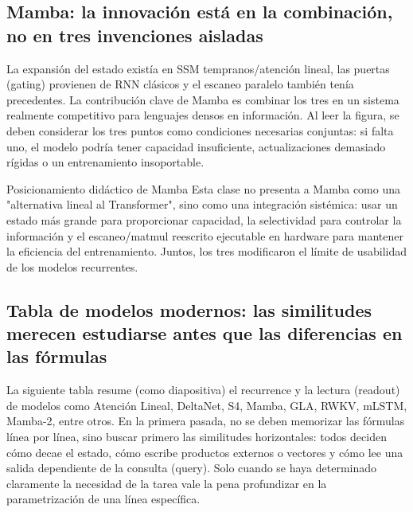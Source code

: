 
\subsection{Mamba: la innovación está en la combinación, no en tres invenciones aisladas}

La expansión del estado existía en SSM tempranos/atención lineal, las puertas (gating) provienen de RNN clásicos y el escaneo paralelo también tenía precedentes. La contribución clave de Mamba es combinar los tres en un sistema realmente competitivo para lenguajes densos en información. Al leer la figura, se deben considerar los tres puntos como condiciones necesarias conjuntas: si falta uno, el modelo podría tener capacidad insuficiente, actualizaciones demasiado rígidas o un entrenamiento insoportable.


\begin{importantbox}{Posicionamiento didáctico de Mamba}
Esta clase no presenta a Mamba como una "alternativa lineal al Transformer", sino como una integración sistémica: usar un estado más grande para proporcionar capacidad, la selectividad para controlar la información y el escaneo/matmul reescrito ejecutable en hardware para mantener la eficiencia del entrenamiento. Juntos, los tres modificaron el límite de usabilidad de los modelos recurrentes.
\end{importantbox}

\subsection{Tabla de modelos modernos: las similitudes merecen estudiarse antes que las diferencias en las fórmulas}

La siguiente tabla resume (como diapositiva) el recurrence y la lectura (readout) de modelos como Atención Lineal, DeltaNet, S4, Mamba, GLA, RWKV, mLSTM, Mamba-2, entre otros. En la primera pasada, no se deben memorizar las fórmulas línea por línea, sino buscar primero las similitudes horizontales: todos deciden cómo decae el estado, cómo escribe productos externos o vectores y cómo lee una salida dependiente de la consulta (query). Solo cuando se haya determinado claramente la necesidad de la tarea vale la pena profundizar en la parametrización de una línea específica.

